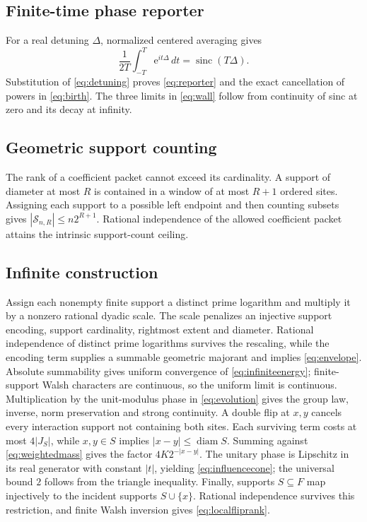 \documentclass[10pt]{article}
\theoremstyle{definition}
\newcommand{\sinc}{\operatorname{sinc}}
\begin{document}
\subsection{Finite-time phase reporter}

For a real detuning \(\Delta\), normalized centered averaging gives
\[
 \frac{1}{2T}\int_{-T}^{T}\mathrm e^{it\Delta}\,dt
 =\sinc(T\Delta).
\]
Substitution of \eqref{eq:detuning} proves
\eqref{eq:reporter} and the exact cancellation of powers in
\eqref{eq:birth}. The three limits in \eqref{eq:wall} follow from continuity
of sinc at zero and its decay at infinity.

\subsection{Geometric support counting}

The rank of a coefficient packet cannot exceed its cardinality. A support
of diameter at most \(R\) is contained in a window of at most \(R+1\)
ordered sites. Assigning each support to a possible left endpoint and then
counting subsets gives
\(|\mathcal S_{n,R}|\le n2^{R+1}\). Rational independence of the allowed
coefficient packet attains the intrinsic support-count ceiling.

\subsection{Infinite construction}

Assign each nonempty finite support a distinct prime logarithm and multiply
it by a nonzero rational dyadic scale. The scale penalizes an injective
support encoding, support cardinality, rightmost extent and diameter.
Rational independence of distinct prime logarithms survives the rescaling,
while the encoding term supplies a summable geometric majorant and implies
\eqref{eq:envelope}. Absolute summability gives uniform convergence of
\eqref{eq:infiniteenergy}; finite-support Walsh characters are continuous,
so the uniform limit is continuous. Multiplication by the unit-modulus
phase in \eqref{eq:evolution} gives the group law, inverse, norm
preservation and strong continuity. A double flip at \(x,y\) cancels every
interaction support not containing both sites. Each surviving term costs
at most \(4|J_S|\), while \(x,y\in S\) implies
\(|x-y|\le\operatorname{diam}S\). Summing against
\eqref{eq:weightedmass} gives the factor \(4K2^{-|x-y|}\). The unitary
phase is Lipschitz in its real generator with constant \(|t|\), yielding
\eqref{eq:influencecone}; the universal bound \(2\) follows from the
triangle inequality. Finally, supports \(S\subseteq F\) map injectively to
the incident supports \(S\cup\{x\}\). Rational independence survives this
restriction, and finite Walsh inversion gives \eqref{eq:localfliprank}.
\end{document}
